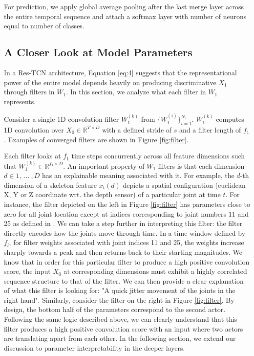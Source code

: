 \documentclass[10pt,twocolumn,letterpaper]{article}
\begin{document}
For prediction, we apply global average pooling after the last merge layer across the entire temporal sequence and attach a softmax layer with number of neurons equal to number of classes.   



\subsection{A Closer Look at Model Parameters}
\label{section:closer}
In a Res-TCN architecture, Equation \ref{eq:4} suggests that the representational power of the entire model depends heavily on producing discriminative $X_1$ through filters in $W_1$. In this section, we analyze what each filter in $W_1$ represents. 

Consider a single 1D convolution filter $W^{(k)}_1$ from $\{W^{(i)}_1\}_{i=1}^{N_1}$. $W^{(k)}_1$ computes 1D convolution over $X_0 \in \mathbb{R}^{T \times D}$ with a defined stride of $s$ and a filter length of $f_1$. Examples of converged filters are shown in Figure \ref{fig:filter}.

Each filter looks at $f_1$ time steps concurrently across all feature dimensions such that $W^{(k)}_1 \in \mathbb{R}^{f_1 \times D}$. An important property of $W_1$ filters is that each dimension $d \in {1,\ ...\ ,D}$ has an explainable meaning associated with it. For example, the $d$-th dimension of a skeleton feature $x_t(d)$ depicts a spatial configuration (euclidean X, Y or Z coordinate wrt. the depth sensor) of a particular joint at time $t$. For instance, the filter depicted on the left in Figure \ref{fig:filter} has parameters close to zero for all joint location except at indices corresponding to joint numbers 11 and 25 as defined in \cite{nturgdb2016}. We can take a step further in interpreting this filter: the filter directly encodes how the joints move through time. In a time window defined by $f_l$, for filter weights associated with joint indices 11 and 25, the weights increase sharply towards a peak and then returns back to their starting magnitudes. We know that in order for this particular filter to produce a high positive convolution score, the input $X_0$ at corresponding dimensions must exhibit a highly correlated sequence structure to that of the filter. We can then provide a clear explanation of what this filter is looking for: "A quick jitter movement of the joints in the right hand". Similarly, consider the filter on the right in Figure \ref{fig:filter}. By design, the bottom half of the parameters correspond to the second actor. Following the same logic described above, we can clearly understand that this filter produces a high positive convolution score with an input where two actors are translating apart from each other. In the following section, we extend our discussion to parameter interpretability in the deeper layers.
\end{document}
